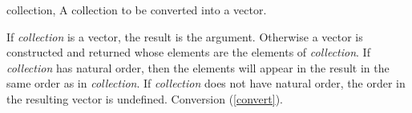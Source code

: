 \begin{optDefinition}
%
\begin{specargs}
    \item[collection, \classref{collection}] A collection to be converted into a
    vector.
\end{specargs}
%
\result%
If {\em collection\/} is a vector, the result is the argument.
Otherwise a vector is constructed and returned whose elements are the elements
of {\em collection}.  If {\em collection\/} has natural order, then the elements
will appear in the result in the same order as in {\em collection}.  If {\em
    collection\/} does not have natural order, the order in the resulting vector
is undefined.
%
\seealso%
Conversion (\ref{convert}).
%
\end{optDefinition}
